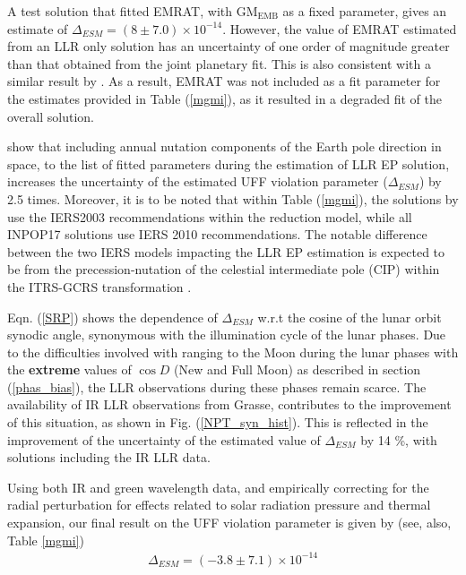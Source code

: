 \documentclass[fleqn,usenatbib,referee]{mnras}
\begin{document}
A test solution that fitted EMRAT, with GM$_{\textrm{EMB}}$ as a fixed parameter, gives an estimate of $\Delta_{ESM} = (8 \pm 7.0 ) \times10^{-14}$. However, the value of EMRAT estimated from an LLR only solution has an uncertainty of one order of magnitude greater than that obtained from the joint planetary fit. This is also consistent with a similar result by \cite{Williams2009}. As a result, EMRAT was not included as a fit parameter for the estimates provided in Table (\ref{mgmi}), as it resulted in a degraded fit of the overall solution.

\cite{Williams2012} show that including annual nutation components of the Earth pole direction in space, to the list of fitted parameters during the estimation of LLR EP solution, increases the uncertainty of the estimated UFF violation parameter ($\Delta_{ESM}$) by 2.5 times. Moreover, it is to be noted that within Table (\ref{mgmi}), the solutions by \cite{Williams2009,Williams2012,Muller2012} use the IERS2003 \cite[]{McCarthy2004} recommendations within the reduction model, while all INPOP17 solutions use IERS 2010 \cite[]{IERS2010} recommendations. The notable difference between the two IERS models impacting the LLR EP estimation is expected to be from the precession-nutation of the celestial intermediate pole (CIP) within the ITRS-GCRS transformation \citet[p.~8]{IERS2010}.

Eqn. (\ref{SRP}) shows the dependence of $\Delta_{ESM}$ w.r.t the cosine of the lunar orbit synodic angle, synonymous with the illumination cycle of the lunar phases. Due to the difficulties involved with ranging to the Moon during the lunar phases with the \textbf{extreme} values of $\cos{D}$ (New and Full Moon) as described in section (\ref{phas_bias}), the LLR observations during these phases remain scarce. The availability of IR LLR observations from Grasse, contributes to the improvement of this situation, as shown in Fig. (\ref{NPT_syn_hist}). This is reflected in the improvement of the uncertainty of the estimated value of $\Delta_{ESM}$ by 14 \%, with solutions including the IR LLR data. 

Using both IR and green wavelength data, and empirically correcting for the radial perturbation for effects related to solar radiation pressure and thermal expansion, our final result on the UFF violation parameter is given by (see, also, Table \ref{mgmi})
\begin{eqnarray}
\Delta_{ESM} = (-3.8 \pm 7.1) \times10^{-14}
\end{eqnarray}
\end{document}

